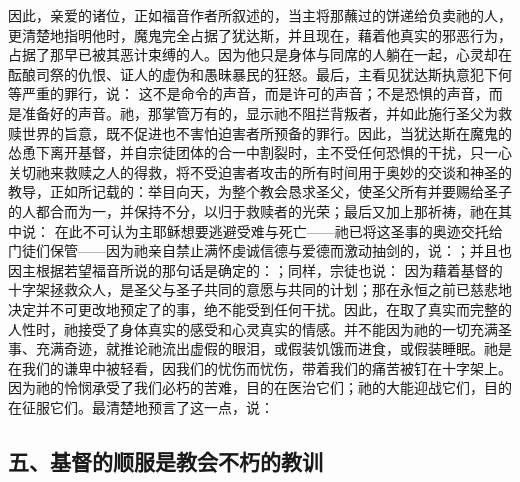 因此，亲爱的诸位，正如福音作者所叙述的，当主将那蘸过的饼递给负卖祂的人，更清楚地指明他时，魔鬼完全占据了犹达斯，并且现在，藉着他真实的邪恶行为，占据了那早已被其恶计束缚的人。因为他只是身体与同席的人躺在一起，心灵却在酝酿司祭的仇恨、证人的虚伪和愚昧暴民的狂怒。最后，主看见犹达斯执意犯下何等严重的罪行，说： 这不是命令的声音，而是许可的声音；不是恐惧的声音，而是准备好的声音。祂，那掌管万有的，显示祂不阻拦背叛者，并如此施行圣父为救赎世界的旨意，既不促进也不害怕迫害者所预备的罪行。因此，当犹达斯在魔鬼的怂恿下离开基督，并自宗徒团体的合一中割裂时，主不受任何恐惧的干扰，只一心关切祂来救赎之人的得救，将不受迫害者攻击的所有时间用于奥妙的交谈和神圣的教导，正如所记载的：举目向天，为整个教会恳求圣父，使圣父所有并要赐给圣子的人都合而为一，并保持不分，以归于救赎者的光荣；最后又加上那祈祷，祂在其中说： 在此不可认为主耶稣想要逃避受难与死亡——祂已将这圣事的奥迹交托给门徒们保管——因为祂亲自禁止满怀虔诚信德与爱德而激动抽剑的，说：；并且也因主根据若望福音所说的那句话是确定的：；同样，宗徒也说： 因为藉着基督的十字架拯救众人，是圣父与圣子共同的意愿与共同的计划；那在永恒之前已慈悲地决定并不可更改地预定了的事，绝不能受到任何干扰。因此，在取了真实而完整的人性时，祂接受了身体真实的感受和心灵真实的情感。并不能因为祂的一切充满圣事、充满奇迹，就推论祂流出虚假的眼泪，或假装饥饿而进食，或假装睡眠。祂是在我们的谦卑中被轻看，因我们的忧伤而忧伤，带着我们的痛苦被钉在十字架上。因为祂的怜悯承受了我们必朽的苦难，目的在医治它们；祂的大能迎战它们，目的在征服它们。最清楚地预言了这一点，说：\par


\subsection{五、基督的顺服是教会不朽的教训}

